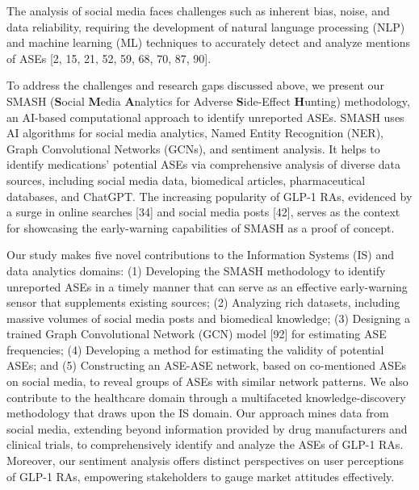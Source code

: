 \documentclass[referee,bst/sn-basic]{sn-jnl}%
\begin{document}
The analysis of social media faces challenges such as inherent bias, noise, and data reliability, requiring the development of natural language processing (NLP) and machine learning (ML) techniques to accurately detect and analyze mentions of ASEs [2, 15, 21, 52, 59, 68, 70, 87, 90]. 

To address the challenges and research gaps discussed above, we present our SMASH (\textbf{S}ocial \textbf{M}edia \textbf{A}nalytics for Adverse \textbf{S}ide-Effect \textbf{H}unting) methodology, an AI-based computational approach to identify unreported ASEs. 
SMASH uses AI algorithms for social media analytics, Named Entity Recognition (NER), Graph Convolutional Networks (GCNs), and sentiment analysis. 
It helps to identify medications' potential ASEs via comprehensive analysis of diverse data sources, including social media data, biomedical articles, pharmaceutical databases, and ChatGPT. 
The increasing popularity of GLP-1 RAs, evidenced by a surge in online searches [34] 
and social media posts [42], 
serves as the context for showcasing the early-warning capabilities of SMASH as a proof of concept.

Our study makes five novel contributions to the Information Systems (IS) and data analytics domains: 
(1) Developing the SMASH methodology to identify unreported ASEs in a timely manner that can serve as an effective early-warning sensor that supplements existing sources; 
(2) Analyzing rich datasets, including massive volumes of social media posts and biomedical knowledge;
(3) Designing a trained Graph Convolutional Network (GCN) model [92] 
for estimating ASE frequencies; 
(4) Developing a method for estimating the validity of potential ASEs; and 
(5) Constructing an ASE-ASE network, based on co-mentioned ASEs on social media, to reveal groups of ASEs with similar network patterns. 
We also contribute to the healthcare domain through a multifaceted knowledge-discovery methodology that draws upon the IS domain.
Our approach mines data from social media, extending beyond information provided by drug manufacturers and clinical trials, to comprehensively identify and analyze the ASEs of GLP-1 RAs. 
Moreover, our sentiment analysis offers distinct perspectives on user perceptions of GLP-1 RAs, empowering stakeholders to gauge market attitudes effectively.
\end{document}
